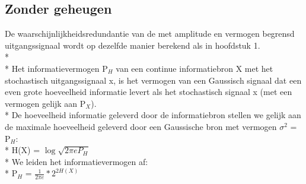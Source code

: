 \documentclass[10pt]{article}
\begin{document}
\subsection{Zonder geheugen}
De waarschijnlijkheidsredundantie van de met amplitude en vermogen begrensd uitgangssignaal wordt op dezelfde manier berekend als in hoofdstuk 1.\\*\\*
Het informatievermogen P$_H$ van een continue informatiebron X met het stochastisch uitgangssignaal x, is het vermogen van een Gaussisch signaal dat een even grote hoeveelheid informatie levert als het stochastisch signaal x (met een vermogen gelijk aan P$_X$).\\*
De hoeveelheid informatie geleverd door de informatiebron stellen we gelijk aan de maximale hoeveelheid geleverd door een Gaussische bron met vermogen $\sigma^2$ = P$_H$:\\*
H(X) = $\log{\sqrt{2\pi e P_H}}$\\*
We leiden het informatievermogen af:\\*
P$_H$ = $\frac{1}{2\pi e}*2^{2H(X)}$
\end{document}
